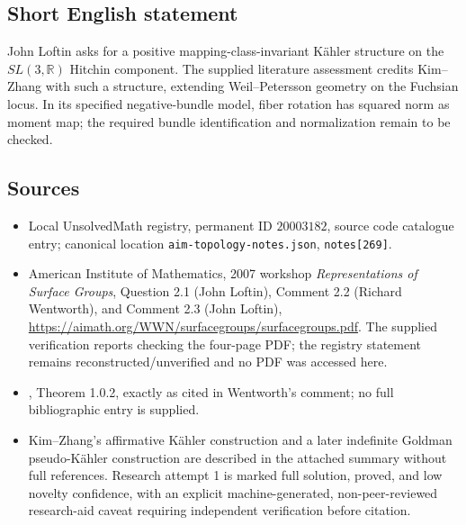 \documentclass[11pt]{article}
\newcommand{\R}{\mathbb{R}}
\begin{document}
\subsection{Short English statement}
John Loftin asks for a positive mapping-class-invariant K\"ahler structure on the $SL(3,\R)$ Hitchin component. The supplied literature assessment credits Kim--Zhang with such a structure, extending Weil--Petersson geometry on the Fuchsian locus. In its specified negative-bundle model, fiber rotation has squared norm as moment map; the required bundle identification and normalization remain to be checked.
\subsection{Sources}
\begin{itemize}
\item Local UnsolvedMath registry, permanent ID $20003182$, source code catalogue entry; canonical location \texttt{aim-topology-notes.json}, \texttt{notes[269]}.
\item American Institute of Mathematics, 2007 workshop \emph{Representations of Surface Groups}, Question 2.1 (John Loftin), Comment 2.2 (Richard Wentworth), and Comment 2.3 (John Loftin), \url{https://aimath.org/WWN/surfacegroups/surfacegroups.pdf}. The supplied verification reports checking the four-page PDF; the registry statement remains reconstructed/unverified and no PDF was accessed here.
\item [Lab06], Theorem 1.0.2, exactly as cited in Wentworth's comment; no full bibliographic entry is supplied.
\item Kim--Zhang's affirmative K\"ahler construction and a later indefinite Goldman pseudo-K\"ahler construction are described in the attached summary without full references. Research attempt 1 is marked full solution, proved, and low novelty confidence, with an explicit machine-generated, non-peer-reviewed research-aid caveat requiring independent verification before citation.
\end{itemize}
\end{document}
